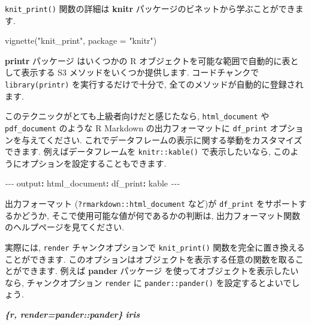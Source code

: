 \documentclass[
  11pt,
  lualatex,ja=standard,jafont=noto]{bxjsreport}
\newenvironment{Shaded}{\begin{snugshade}}{\end{snugshade}}
\newcommand{\AttributeTok}[1]{\textcolor[rgb]{0.77,0.63,0.00}{#1}}
\newcommand{\FunctionTok}[1]{\textcolor[rgb]{0.00,0.00,0.00}{#1}}
\newcommand{\InformationTok}[1]{\textcolor[rgb]{0.56,0.35,0.01}{\textbf{\textit{#1}}}}
\newcommand{\KeywordTok}[1]{\textcolor[rgb]{0.13,0.29,0.53}{\textbf{#1}}}
\newcommand{\NormalTok}[1]{#1}
\newcommand{\PreprocessorTok}[1]{\textcolor[rgb]{0.56,0.35,0.01}{\textit{#1}}}
\newcommand{\StringTok}[1]{\textcolor[rgb]{0.31,0.60,0.02}{#1}}
\begin{document}
\texttt{knit\_print()} 関数の詳細は \textbf{knitr} パッケージのビネットから学ぶことができます.

\begin{Shaded}
\begin{Highlighting}[numbers=left,,]
\FunctionTok{vignette}\NormalTok{(}\StringTok{"knit\_print"}\NormalTok{, }\AttributeTok{package =} \StringTok{"knitr"}\NormalTok{)}
\end{Highlighting}
\end{Shaded}

\textbf{printr} パッケージ \autocite{R-printr} はいくつかの R オブジェクトを可能な範囲で自動的に表として表示する S3 メソッドをいくつか提供します. コードチャンクで \texttt{library(printr)} を実行するだけで十分で, 全てのメソッドが自動的に登録されます.

このテクニックがとても上級者向けだと感じたなら, \texttt{html\_document} や \texttt{pdf\_document} のような R Markdown の出力フォーマットに \texttt{df\_print} オプションを与えてください. これでデータフレームの表示に関する挙動をカスタマイズできます. 例えばデータフレームを \texttt{knitr::kable()} で表示したいなら, このようにオプションを設定することもできます.

\begin{Shaded}
\begin{Highlighting}[]
\PreprocessorTok{{-}{-}{-}}
\FunctionTok{output}\KeywordTok{:}
\AttributeTok{  }\FunctionTok{html\_document}\KeywordTok{:}
\AttributeTok{    }\FunctionTok{df\_print}\KeywordTok{:}\AttributeTok{ kable}
\PreprocessorTok{{-}{-}{-}}
\end{Highlighting}
\end{Shaded}

出力フォーマット (\texttt{?rmarkdown::html\_document} など)が \texttt{df\_print} をサポートするかどうか, そこで使用可能な値が何であるかの判断は, 出力フォーマット関数のヘルプページを見てください.

実際には, \texttt{render} チャンクオプションで \texttt{knit\_print()} 関数を完全に置き換えることができます. このオプションはオブジェクトを表示する任意の関数を取ることができます. 例えば \textbf{pander} パッケージ を使ってオブジェクトを表示したいなら, チャンクオプション \texttt{render} に \texttt{pander::pander()} を設定するとよいでしょう.

\begin{Shaded}
\begin{Highlighting}[]
\InformationTok{\textasciigrave{}\textasciigrave{}\textasciigrave{}\{r, render=pander::pander\}}
\InformationTok{iris}
\InformationTok{\textasciigrave{}\textasciigrave{}\textasciigrave{}}
\end{Highlighting}
\end{Shaded}
\end{document}
